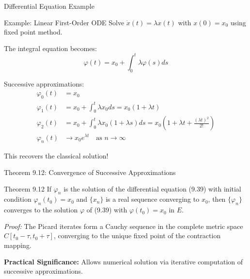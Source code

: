 \documentclass[aspectratio=169,10pt]{beamer}
\begin{document}
\begin{frame}[fragile]{Differential Equation Example}
    \begin{block}{Example: Linear First-Order ODE}
        Solve $\dot{x}(t) = \lambda x(t)$ with $x(0) = x_0$ using fixed point method.

        \vspace{0.3cm}

        The integral equation becomes:
        \[\varphi(t) = x_0 + \int_0^t \lambda \varphi(s) ds\]

        \vspace{0.3cm}

        Successive approximations:
        \begin{align*}
        \varphi_0(t) &= x_0 \\
        \varphi_1(t) &= x_0 + \int_0^t \lambda x_0 ds = x_0(1 + \lambda t) \\
        \varphi_2(t) &= x_0 + \int_0^t \lambda x_0(1 + \lambda s) ds = x_0\left(1 + \lambda t + \frac{(\lambda t)^2}{2!}\right) \\
        \varphi_n(t) &\to x_0 e^{\lambda t} \quad \text{as } n \to \infty
        \end{align*}
    \end{block}

    \vspace{0.2cm}

    This recovers the classical solution!
\end{frame}

\begin{frame}{Theorem 9.12: Convergence of Successive Approximations}
    \begin{block}{Theorem 9.12}
        If $\varphi_n$ is the solution of the differential equation (9.39) with initial condition $\varphi_n(t_0) = x_0$ and $\{x_n\}$ is a real sequence converging to $x_0$, then $\{\varphi_n\}$ converges to the solution $\varphi$ of (9.39) with $\varphi(t_0) = x_0$ in $E$.

        \vspace{0.3cm}

        \textit{Proof:} The Picard iterates form a Cauchy sequence in the complete metric space $C[t_0-\tau, t_0+\tau]$, converging to the unique fixed point of the contraction mapping.
    \end{block}

    \vspace{0.3cm}

    \textbf{Practical Significance:} Allows numerical solution via iterative computation of successive approximations.
\end{frame}
\end{document}
